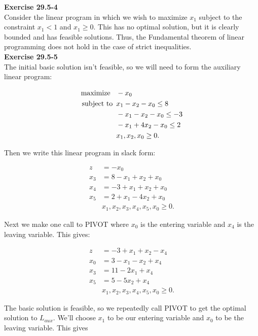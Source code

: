 \documentclass{article}
\begin{document}
\noindent\textbf{Exercise 29.5-4}\\

Consider the linear program in which we wish to maximize $x_1$ subject to the constraint $x_1 < 1$ and $x_1 \geq 0$.  This has no optimal solution, but it is clearly bounded and has feasible solutions. Thus, the Fundamental theorem of linear programming does not hold in the case of strict inequalities. \\

\noindent\textbf{Exercise 29.5-5}\\

The initial basic solution isn't feasible, so we will need to form the auxiliary linear program:

\begin{align*}
\mbox{maximize \,\,\,} & -x_0\\
\mbox{subject to \,} &x_1 - x_2 - x_0 \leq 8 \\
& -x_1 - x_2 - x_0 \leq -3\\
& -x_1 + 4x_2 - x_0 \leq 2 \\
& x_1,x_2,x_0 \geq 0.
\end{align*}

Then we write this linear program in slack form:

\begin{align*}
z &= -x_0\\
x_3 &= 8 -x_1 + x_2 + x_0 \\
x_4&= -3 +x_1 + x_2 + x_0\\
x_5&=2 +x_1 - 4x_2 + x_0 \\
& x_1,x_2,x_3, x_4, x_5, x_0 \geq 0.
\end{align*}

Next we make one call to PIVOT where $x_0$ is the entering variable and $x_4$ is the leaving variable. This gives:

\begin{align*}
z &= -3 + x_1 + x_2 - x_4\\
x_0 &= 3 - x_1 - x_2 + x_4 \\
x_3 &= 11 - 2x_1 + x_4\\
x_5 &= 5 - 5x_2 + x_4 \\
& x_1,x_2,x_3, x_4, x_5, x_0 \geq 0.
\end{align*}

The basic solution is feasible, so we repeatedly call PIVOT to get the optimal solution to $L_{aux}$.  We'll choose $x_1$ to be our entering variable and $x_0$ to be the leaving variable.  This gives
\end{document}
